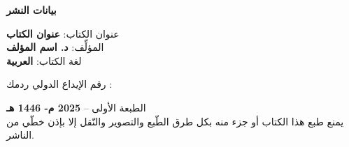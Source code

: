 
\newpage
\thispagestyle{empty}
\begin{center}
{\Large \textbf{بيانات النشر}}

\vspace{1cm}
عنوان الكتاب: \textbf{عنوان الكتاب} \\[0.5em]
المؤلِّف: \textbf{د. اسم المؤلف} \\[0.5em]
لغة الكتاب: \textbf{العربية} \\[0.5em]

\smallskip

رقم الإيداع الدولي ردمك \textbf{}: \\[0.3em]
\textbf{}

\smallskip

الطبعة الأولى – \textbf{2025 م- 1446 هـ} \\[0.5em]
يمنع طبع هذا الكتاب أو جزء منه بكل طرق الطّبع والتصوير والنّقل إلا بإذن خطّي من الناشر.

\vfill
\end{center}
